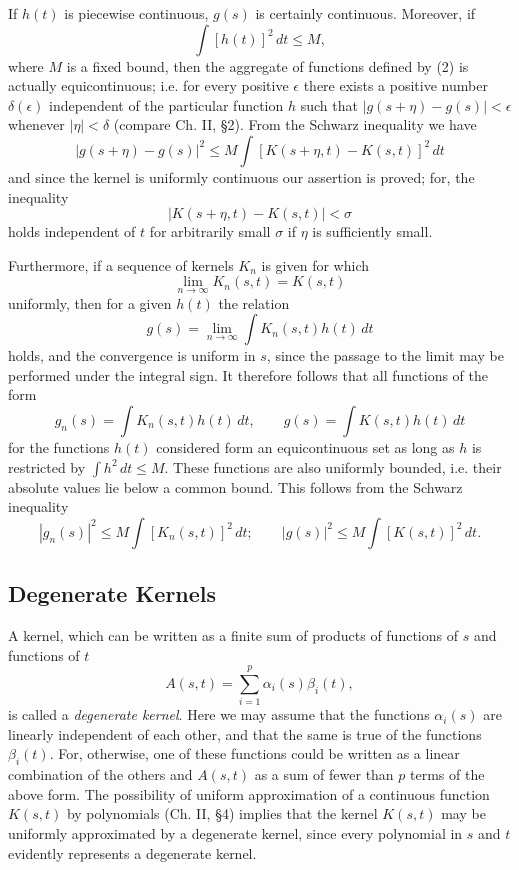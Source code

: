 If $h(t)$ is piecewise continuous, $g(s)$ is certainly continuous. Moreover, if
\[
\int [h(t)]^2\,dt\le M,
\]
where $M$ is a fixed bound, then the aggregate of functions defined by (2) is actually equicontinuous; i.e. for every positive $\epsilon$ there exists a positive number $\delta(\epsilon)$ independent of the particular function $h$ such that $|g(s+\eta)-g(s)|<\epsilon$ whenever $|\eta|<\delta$ (compare Ch. II, \S2). From the Schwarz inequality we have
\[
|g(s+\eta)-g(s)|^2
\le M\int [K(s+\eta,t)-K(s,t)]^2\,dt
\]
and since the kernel is uniformly continuous our assertion is proved; for, the inequality
\[
|K(s+\eta,t)-K(s,t)|<\sigma
\]
holds independent of $t$ for arbitrarily small $\sigma$ if $\eta$ is sufficiently small.

Furthermore, if a sequence of kernels $K_n$ is given for which
\[
\lim_{n\to\infty}K_n(s,t)=K(s,t)
\]
uniformly, then for a given $h(t)$ the relation
\[
g(s)=\lim_{n\to\infty}\int K_n(s,t)h(t)\,dt
\]
holds, and the convergence is uniform in $s$, since the passage to the limit may be performed under the integral sign. It therefore follows that all functions of the form
\[
g_n(s)=\int K_n(s,t)h(t)\,dt,
\qquad
g(s)=\int K(s,t)h(t)\,dt
\]
for the functions $h(t)$ considered form an equicontinuous set as long as $h$ is restricted by $\int h^2\,dt\le M$. These functions are also uniformly bounded, i.e. their absolute values lie below a common bound. This follows from the Schwarz inequality
\[
|g_n(s)|^2\le M\int [K_n(s,t)]^2\,dt;
\qquad
|g(s)|^2\le M\int [K(s,t)]^2\,dt.
\]

\subsection{Degenerate Kernels}
A kernel, which can be written as a finite sum of products of functions of $s$ and functions of $t$
\begin{equation}\tag{3}
A(s,t)=\sum_{i=1}^{p}\alpha_i(s)\beta_i(t),
\end{equation}
is called a \emph{degenerate kernel}. Here we may assume that the functions $\alpha_i(s)$ are linearly independent of each other, and that the same is true of the functions $\beta_i(t)$. For, otherwise, one of these functions could be written as a linear combination of the others and $A(s,t)$ as a sum of fewer than $p$ terms of the above form. The possibility of uniform approximation of a continuous function $K(s,t)$ by polynomials (Ch. II, \S4) implies that the kernel $K(s,t)$ may be uniformly approximated by a degenerate kernel, since every polynomial in $s$ and $t$ evidently represents a degenerate kernel.

